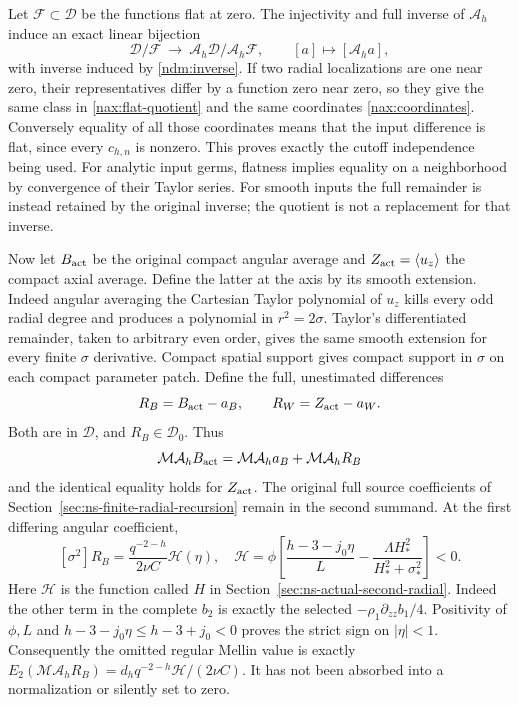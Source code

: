 Let $\mathcal F\subset\mathcal D$ be the functions flat at zero.
The injectivity and full inverse of $\mathcal A_h$ induce an exact
linear bijection
\begin{equation}\label{nax:flat-quotient}
 \mathcal D/\mathcal F\ \longrightarrow\
 \mathcal A_h\mathcal D/\mathcal A_h\mathcal F,
 \qquad [a]\longmapsto[\mathcal A_h a],
\end{equation}
with inverse induced by \eqref{ndm:inverse}. If two radial localizations
are one near zero, their representatives differ by a function zero
near zero, so they give the same class in \eqref{nax:flat-quotient} and
the same coordinates \eqref{nax:coordinates}. Conversely equality of
all those coordinates means that the input difference is flat, since
every $c_{h,n}$ is nonzero. This proves exactly the cutoff independence
being used. For analytic input germs, flatness implies equality on a
neighborhood by convergence of their Taylor series. For smooth inputs
the full remainder is instead retained by the original inverse; the
quotient is not a replacement for that inverse.

Now let $B_{\rm act}$ be the original compact angular average and
$Z_{\rm act}=\langle u_z\rangle$ the compact axial average. Define
the latter at the axis by its smooth extension. Indeed angular averaging
the Cartesian Taylor polynomial of $u_z$ kills every odd radial degree
and produces a polynomial in $r^2=2\sigma$. Taylor's differentiated
remainder, taken to arbitrary even order, gives the same smooth extension
for every finite $\sigma$ derivative. Compact spatial support gives
compact support in $\sigma$ on each compact parameter patch. Define
the full, unestimated differences
\[
 R_B=B_{\rm act}-a_B,\qquad R_W=Z_{\rm act}-a_W.
\]
Both are in $\mathcal D$, and $R_B\in\mathcal D_0$. Thus
\[
 \mathcal M\mathcal A_hB_{\rm act}
 =\mathcal M\mathcal A_h a_B+\mathcal M\mathcal A_hR_B
\]
and the identical equality holds for $Z_{\rm act}$. The original full
source coefficients of Section~\ref{sec:ns-finite-radial-recursion}
remain in the second summand. At the first differing angular coefficient,
\begin{equation}\label{nax:first-remainder}
 [\sigma^2]R_B=\frac{q^{-2-h}}{2\nu C}\mathcal H(\eta),\quad
 \mathcal H=\phi\left[
 \frac{h-3-j_0\eta}{L}
 -\frac{\Lambda H_*^2}{H_*^2+\sigma_*^2}\right]<0.
\end{equation}
Here $\mathcal H$ is the function called $H$ in
Section~\ref{sec:ns-actual-second-radial}. Indeed the other term in
the complete $b_2$ is exactly the selected
$-\rho_1\partial_{zz}b_1/4$. Positivity of $\phi,L$ and
$h-3-j_0\eta\leq h-3+j_0<0$ proves the strict sign on $|\eta|<1$.
Consequently the omitted regular Mellin value is exactly
$E_2(\mathcal M\mathcal A_hR_B)=d_hq^{-2-h}\mathcal H/(2\nu C)$.
It has not been absorbed into a normalization or silently set to zero.

